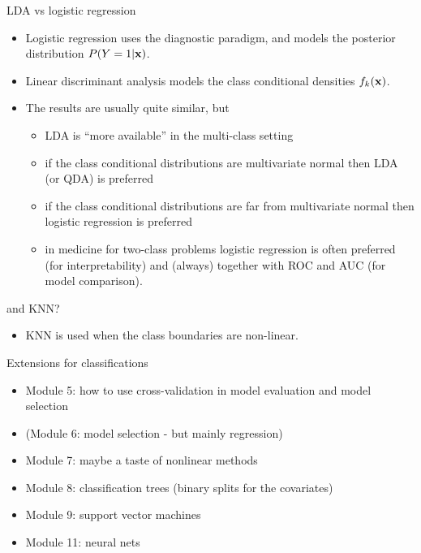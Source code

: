 \documentclass[10pt,ignorenonframetext,]{beamer}
\providecommand{\tightlist}{%
  \setlength{\itemsep}{0pt}\setlength{\parskip}{0pt}}
\begin{document}
\begin{frame}

\begin{block}{LDA vs logistic regression}

\begin{itemize}
\tightlist
\item
  Logistic regression uses the diagnostic paradigm, and models the
  posterior distribution \(P(Y=1|{\bf x})\).
\item
  Linear discriminant analysis models the class conditional densities
  \(f_k({\bf x})\).
\item
  The results are usually quite similar, but

  \begin{itemize}
  \tightlist
  \item
    LDA is ``more available'' in the multi-class setting
  \item
    if the class conditional distributions are multivariate normal then
    LDA (or QDA) is preferred
  \item
    if the class conditional distributions are far from multivariate
    normal then logistic regression is preferred
  \item
    in medicine for two-class problems logistic regression is often
    preferred (for interpretability) and (always) together with ROC and
    AUC (for model comparison).
  \end{itemize}
\end{itemize}

\end{block}

\begin{block}{and KNN?}

\begin{itemize}
\tightlist
\item
  KNN is used when the class boundaries are non-linear.
\end{itemize}

\end{block}

\end{frame}

\begin{frame}

\begin{block}{Extensions for classifications}

\begin{itemize}
\tightlist
\item
  Module 5: how to use cross-validation in model evaluation and model
  selection
\item
  (Module 6: model selection - but mainly regression)
\item
  Module 7: maybe a taste of nonlinear methods
\item
  Module 8: classification trees (binary splits for the covariates)
\item
  Module 9: support vector machines
\item
  Module 11: neural nets
\end{itemize}

\end{block}

\end{frame}
\end{document}
